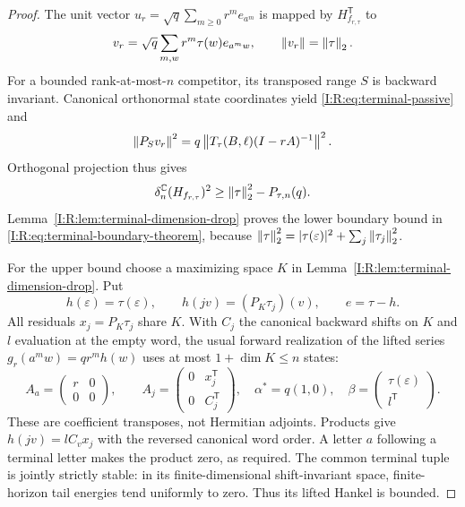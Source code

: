 \begin{proof}
The unit vector
$u_r=\sqrt q\sum_{m\ge0}r^m e_{a^m}$ is mapped by
$H_{f_{r,\tau}}^{\mathsf T}$ to
\[
 v_r=\sqrt q\sum_{m,w}r^m\tau(w)e_{a^m w},\qquad
 \left\lVert v_r\right\rVert=\left\lVert\tau\right\rVert_2.
\]
For a bounded rank-at-most-$n$ competitor, its transposed range $S$ is
backward invariant.  Canonical orthonormal state coordinates yield
\eqref{I:R:eq:terminal-passive} and
\[
 \left\lVert P_Sv_r\right\rVert^2
   =q\left\lVert T_\tau(B,\ell)(I-rA)^{-1}\right\rVert^2.
\]
Orthogonal projection thus gives
\[
 \delta_n^{\mathbb C}(H_{f_{r,\tau}})^2
   \ge\left\lVert\tau\right\rVert_2^2-P_{\tau,n}(q).
\]
Lemma~\ref{I:R:lem:terminal-dimension-drop} proves the lower boundary
bound in \eqref{I:R:eq:terminal-boundary-theorem}, because
$\left\lVert\tau\right\rVert_2^2=|\tau(\varepsilon)|^2+\sum_j\left\lVert\tau_j\right\rVert_2^2$.

For the upper bound choose a maximizing space $K$ in
Lemma~\ref{I:R:lem:terminal-dimension-drop}.  Put
\[
 h(\varepsilon)=\tau(\varepsilon),\qquad
 h(jv)=(P_K\tau_j)(v),\qquad e=\tau-h.
\]
All residuals $x_j=P_K\tau_j$ share $K$.  With $C_j$ the canonical
backward shifts on $K$ and $l$ evaluation at the empty word, the usual
forward realization of the lifted series
$g_r(a^m w)=qr^m h(w)$ uses at most $1+\dim K\le n$ states:
\begin{equation}
 A_a=\begin{pmatrix}r&0\\0&0\end{pmatrix},\qquad
 A_j=\begin{pmatrix}0&x_j^{\mathsf T}\\0&C_j^{\mathsf T}\end{pmatrix},
 \quad\alpha^*=q(1,0),\quad
 \beta=\begin{pmatrix}\tau(\varepsilon)\\l^{\mathsf T}\end{pmatrix}.
 \label{I:R:eq:terminal-lift}
\end{equation}
These are coefficient transposes, not Hermitian adjoints.  Products
give $h(jv)=lC_vx_j$ with the reversed canonical word order.  A letter
$a$ following a terminal letter makes the product zero, as required.
The common terminal tuple is jointly strictly stable: in its
finite-dimensional shift-invariant space, finite-horizon tail energies
tend uniformly to zero.  Thus its lifted Hankel is bounded.


\end{proof}
